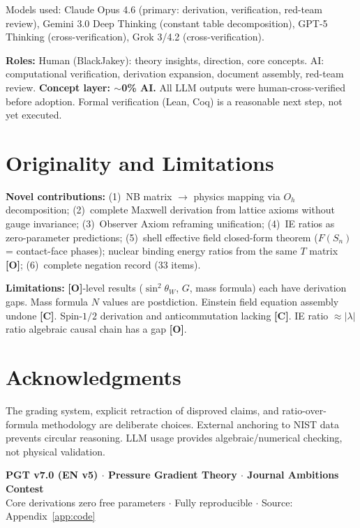 \documentclass[11pt,a4paper]{article}
\newcommand{\gradeO}{\textbf{[O]}}
\newcommand{\gradeC}{\textbf{[C]}}
\begin{document}
Models used: Claude Opus 4.6 (primary: derivation, verification, red-team review), Gemini 3.0 Deep Thinking (constant table decomposition), GPT-5 Thinking (cross-verification), Grok 3/4.2 (cross-verification).

\textbf{Roles:} Human (BlackJakey): theory insights, direction, core concepts. AI: computational verification, derivation expansion, document assembly, red-team review. \textbf{Concept layer: $\sim$0\% AI.} All LLM outputs were human-cross-verified before adoption. Formal verification (Lean, Coq) is a reasonable next step, not yet executed.

\section{Originality and Limitations}\label{sec:limitations}

\textbf{Novel contributions:} (1)~NB matrix $\to$ physics mapping via $O_h$ decomposition; (2)~complete Maxwell derivation from lattice axioms without gauge invariance; (3)~Observer Axiom reframing unification; (4)~IE ratios as zero-parameter predictions; (5)~shell effective field closed-form theorem ($F(S_n)$ = contact-face phases); nuclear binding energy ratios from the same $T$ matrix \gradeO; (6)~complete negation record (33 items).

\textbf{Limitations:} \gradeO-level results ($\sin^2\theta_W$, $G$, mass formula) each have derivation gaps. Mass formula $N$ values are postdiction. Einstein field equation assembly undone \gradeC. Spin-$1/2$ derivation and anticommutation lacking \gradeC. IE ratio $\approx |\lambda|$ ratio algebraic causal chain has a gap \gradeO.

\section*{Acknowledgments}

The grading system, explicit retraction of disproved claims, and ratio-over-formula methodology are deliberate choices. External anchoring to NIST data~\cite{NIST} prevents circular reasoning. LLM usage provides algebraic/numerical checking, not physical validation.

\bigskip
\begin{center}
\textbf{PGT v7.0 (EN v5) $\cdot$ Pressure Gradient Theory $\cdot$ Journal Ambitions Contest}\\
Core derivations zero free parameters $\cdot$ Fully reproducible $\cdot$ Source: Appendix~\ref{app:code}
\end{center}
\end{document}

